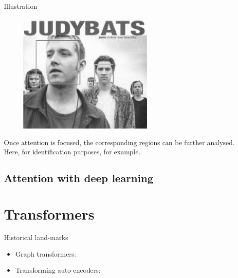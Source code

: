 \documentclass[xcolor=pdftex,dvipsnames,table,mathserif]{beamer}
\begin{document}
\begin{frame}{Illustration~\cite{viola_rapid_2001}}

\begin{figure}[ht]
  \centering
  \includegraphics[width=0.6\textwidth]{viola_jones_example}
\end{figure}

Once attention is focused, the corresponding regions can be further analysed. Here, for identification purposes, for example.

\end{frame}


\subsection{Attention with deep learning}




\section{Transformers}


\begin{frame}{Historical land-marks}

\begin{itemize}
\item Graph transformers: \cite{lecun_gradient-based_1998}
\item Transforming auto-encoders: \cite{hinton_transforming_2011}
\end{itemize}

\end{frame}


\end{document}
